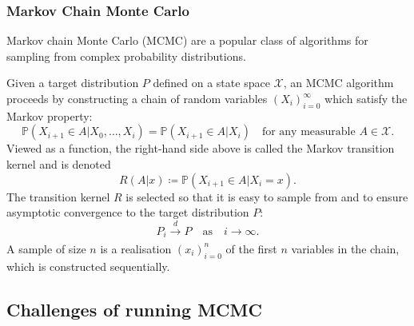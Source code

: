 \documentclass{beamer}
\begin{document}
\begin{frame}
\frametitle{Markov Chain Monte Carlo}
Markov chain Monte Carlo (MCMC) are a popular class of algorithms for sampling from complex probability distributions.

Given a target distribution $P$ defined on a state space $\mathcal{X}$, an MCMC algorithm proceeds by constructing a chain of random variables $(X_i)_{i=0}^\infty$  which satisfy the Markov property:
\begin{equation*}
\mathbb{P}(X_{i+1}\in A | X_0, \dots, X_i) = \mathbb{P}(X_{i+1}\in A | X_i) \quad\text{for any measurable } A \in \mathcal{X}.
\end{equation*}
Viewed as a function, the right-hand side above is called the Markov transition kernel and is denoted 
\begin{equation*}
R(A | x) \coloneq \mathbb{P}(X_{i+1}\in A | X_i = x).
\end{equation*}
The transition kernel $R$ is selected so that it is easy to sample from and to ensure asymptotic convergence to the target distribution $P$:
\begin{equation*}
P_i \xrightarrow[]{d} P \quad\text{as}\quad i \to \infty.
\end{equation*}
A sample of size $n$ is a realisation $(x_i)_{i=0}^n$ of the first $n$ variables in the chain, which is constructed sequentially.
\end{frame}

\subsection{Challenges of running MCMC}
\end{document}
